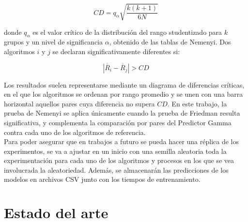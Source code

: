 \[
CD = q_{\alpha} \sqrt{\frac{k(k+1)}{6N}}
\]

donde $q_{\alpha}$ es el valor crítico de la distribución del rango studentizado para $k$ grupos y un nivel de significancia $\alpha$, obtenido de las tablas de Nemenyi. Dos algoritmos $i$ y $j$ se declaran significativamente diferentes si:

\[
\left| \bar{R}_i - \bar{R}_j \right| > CD
\]

Los resultados suelen representarse mediante un diagrama de diferencias críticas, en el que los algoritmos se ordenan por rango promedio y se unen con una barra horizontal aquellos pares cuya diferencia no supera $CD$. En este trabajo, la prueba de Nemenyi se aplica únicamente cuando la prueba de Friedman resulta significativa, y complementa la comparación por pares del Predictor Gamma contra cada uno de los algoritmos de referencia.\\[.15cm]

Para poder asegurar que en trabajos a futuro se pueda hacer una réplica de los experimentos, se va a ajustar en un inicio con una semilla aleatoria toda la experimentación para cada uno de los algoritmos y procesos en los que se vea involucrada la aleatoriedad. Además, se almacenarán las predicciones de los modelos en archivos CSV junto con los tiempos de entrenamiento.

\section{Estado del arte}


